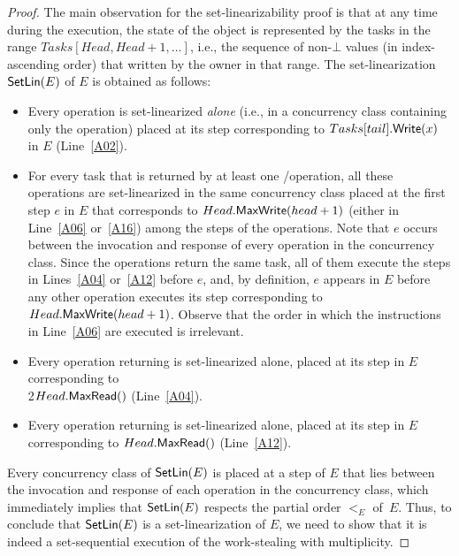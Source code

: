 \begin{proof}
The main observation for the set-linearizability proof is that at any time during the execution, the state of the object is represented by the tasks in the range \(Tasks[Head, Head+1, \hdots ]\), i.e., the sequence of non-\(\bot\) values (in index-ascending order) that written by the owner in that range. The set-linearization \({\sf \small SetLin}(E)\) of \(E\) is obtained as follows:

\begin{itemize}

\item Every \Put operation is set-linearized \emph{alone} (i.e., in a concurrency class containing only the operation) placed at its step corresponding to \(Tasks[tail].{\sf \small Write}(x)\) in \(E\) (Line~\ref{A02}).

\item For every task that is returned by at least one \Take/\Steal operation, all these operations are set-linearized in the same concurrency class placed at the first step \(e\) in \(E\) that corresponds to \(Head.{\sf \small MaxWrite}(head+1)\) (either in Line~\ref{A06} or~\ref{A16}) among the steps of the operations.  Note that \(e\) occurs between the invocation and response of every operation in the concurrency class. Since the operations return the same task, all of them execute the \MaxR steps in Lines~\ref{A04} or~\ref{A12} before \(e\), and, by definition, \(e\) appears in \(E\) before any other operation executes its step corresponding to \(Head.{\sf \small MaxWrite}(head+1)\).  Observe that the order in which the instructions in Line~\ref{A06} are executed is irrelevant.

\item Every \Take operation returning \epty is set-linearized alone, placed at its step in \(E\) corresponding to\\2\(Head.{\sf \small MaxRead}()\) (Line~\ref{A04}).

\item Every \Steal operation returning \epty is set-linearized alone, placed at its step in \(E\) corresponding to \(Head.{\sf \small MaxRead}()\) (Line~\ref{A12}).

\end{itemize}

Every concurrency class of \({\sf \small SetLin}(E)\) is placed at a step of \(E\) that lies between the invocation and response of each operation in the concurrency class, which immediately implies that \({\sf \small SetLin}(E)\) respects the partial order \(<_E\) of~\(E\). Thus, to conclude that \({\sf \small SetLin}(E)\) is a set-linearization of \(E\), we need to show that it is indeed a set-sequential execution of the work-stealing with multiplicity.


\end{proof}
